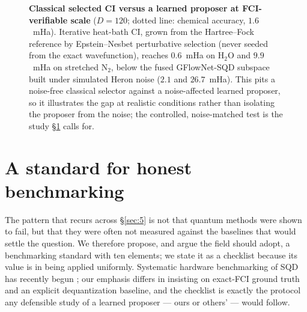 \documentclass[11pt]{article}
\begin{document}
\begin{figure}[tb]
\centering
{}
\caption{\textbf{Classical selected CI versus a learned proposer at FCI-verifiable scale} ($D=120$; dotted line: chemical accuracy, $1.6$~mHa). Iterative heat-bath CI, grown from the Hartree--Fock reference by Epstein--Nesbet perturbative selection (never seeded from the exact wavefunction), reaches $0.6$~mHa on H$_2$O and $9.9$~mHa on stretched N$_2$, below the fused GFlowNet-SQD subspace built under simulated Heron noise ($2.1$ and $26.7$~mHa). This pits a noise-free classical selector against a noise-affected learned proposer, so it illustrates the gap at realistic conditions rather than isolating the proposer from the noise; the controlled, noise-matched test is the study \S\ref{sec:6} calls for.}
\label{fig:hci}
\end{figure}


\section{A standard for honest benchmarking}\label{sec:6}

The pattern that recurs across \S\ref{sec:5} is not that quantum methods were shown to fail, but that they were often not measured against the baselines that would settle the question. We therefore propose, and argue the field should adopt, a benchmarking standard with ten elements; we state it as a checklist because its value is in being applied uniformly. Systematic hardware benchmarking of SQD has recently begun \cite{raisuddin2025}; our emphasis differs in insisting on exact-FCI ground truth and an explicit dequantization baseline, and the checklist is exactly the protocol any defensible study of a learned proposer --- ours or others' --- would follow.
\end{document}
